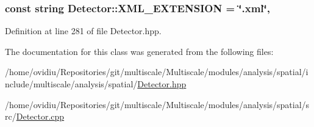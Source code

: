 \hypertarget{classmultiscale_1_1analysis_1_1Detector_a89d56e81155e57f3dcaeef293e89efc2}{
\subsubsection[{X\-M\-L\-\_\-\-E\-X\-T\-E\-N\-S\-I\-O\-N}]{\setlength{\rightskip}{0pt plus 5cm}const string Detector\-::\-X\-M\-L\-\_\-\-E\-X\-T\-E\-N\-S\-I\-O\-N = \char`\"{}.xml\char`\"{}\hspace{0.3cm}{\ttfamily [static]}, {\ttfamily [protected]}}}\label{classmultiscale_1_1analysis_1_1Detector_a89d56e81155e57f3dcaeef293e89efc2}


Definition at line 281 of file Detector.\-hpp.



The documentation for this class was generated from the following files\-:\begin{DoxyCompactItemize}
\item 
/home/ovidiu/\-Repositories/git/multiscale/\-Multiscale/modules/analysis/spatial/include/multiscale/analysis/spatial/\hyperlink{Detector_8hpp}{Detector.\-hpp}\item 
/home/ovidiu/\-Repositories/git/multiscale/\-Multiscale/modules/analysis/spatial/src/\hyperlink{Detector_8cpp}{Detector.\-cpp}\end{DoxyCompactItemize}
